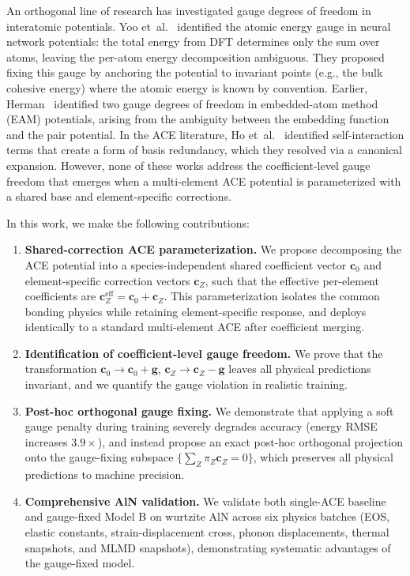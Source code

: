 \documentclass[twoside,prb,aps,floatfix,superscriptaddress,longbibliography]{revtex4-2}
\begin{document}
An orthogonal line of research has investigated gauge degrees of freedom in interatomic potentials. Yoo et~al.~\cite{Yoo2019AtomicEnergyMapping} identified the atomic energy gauge in neural network potentials: the total energy from DFT determines only the sum over atoms, leaving the per-atom energy decomposition ambiguous. They proposed fixing this gauge by anchoring the potential to invariant points (e.g., the bulk cohesive energy) where the atomic energy is known by convention. Earlier, Herman~\cite{Herman2008EAMGauge} identified two gauge degrees of freedom in embedded-atom method (EAM) potentials, arising from the ambiguity between the embedding function and the pair potential. In the ACE literature, Ho et~al.~\cite{Ho2024ACESelfInteraction} identified self-interaction terms that create a form of basis redundancy, which they resolved via a canonical expansion. However, none of these works address the coefficient-level gauge freedom that emerges when a multi-element ACE potential is parameterized with a shared base and element-specific corrections.

In this work, we make the following contributions:

\begin{enumerate}[label=\textbf{(C\arabic*)}]
    \item \textbf{Shared-correction ACE parameterization.} We propose decomposing the ACE potential into a species-independent shared coefficient vector $\mathbf{c}_0$ and element-specific correction vectors $\mathbf{c}_Z$, such that the effective per-element coefficients are $\mathbf{c}^{\mathrm{eff}}_Z = \mathbf{c}_0 + \mathbf{c}_Z$. This parameterization isolates the common bonding physics while retaining element-specific response, and deploys identically to a standard multi-element ACE after coefficient merging.
    \item \textbf{Identification of coefficient-level gauge freedom.} We prove that the transformation $\mathbf{c}_0 \to \mathbf{c}_0 + \mathbf{g}$, $\mathbf{c}_Z \to \mathbf{c}_Z - \mathbf{g}$ leaves all physical predictions invariant, and we quantify the gauge violation in realistic training.
    \item \textbf{Post-hoc orthogonal gauge fixing.} We demonstrate that applying a soft gauge penalty during training severely degrades accuracy (energy RMSE increases $3.9\times$), and instead propose an exact post-hoc orthogonal projection onto the gauge-fixing subspace $\{\sum_Z \pi_Z \mathbf{c}_Z = 0\}$, which preserves all physical predictions to machine precision.
    \item \textbf{Comprehensive AlN validation.} We validate both single-ACE baseline and gauge-fixed Model B on wurtzite AlN across six physics batches (EOS, elastic constants, strain-displacement cross, phonon displacements, thermal snapshots, and MLMD snapshots), demonstrating systematic advantages of the gauge-fixed model.
\end{enumerate}
\end{document}

